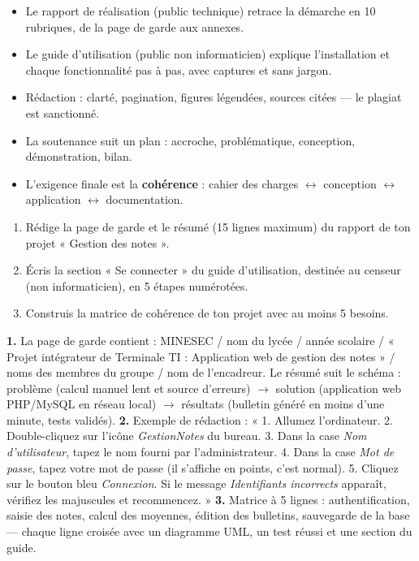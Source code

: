 \documentclass[11pt]{article}
\newcommand{\cle}[1]{{\popxbold\color{popdark}#1}}
\begin{document}
\begin{aretenir}
\begin{itemize}
\item Le \cle{rapport de réalisation} (public technique) retrace la démarche en 10 rubriques, de la page de garde aux annexes.
\item Le \cle{guide d'utilisation} (public non informaticien) explique l'installation et chaque fonctionnalité pas à pas, avec captures et sans jargon.
\item Rédaction : clarté, pagination, figures légendées, sources citées — le plagiat est sanctionné.
\item La soutenance suit un plan : accroche, problématique, conception, démonstration, bilan.
\item L'exigence finale est la \textbf{cohérence} : cahier des charges $\leftrightarrow$ conception $\leftrightarrow$ application $\leftrightarrow$ documentation.
\end{itemize}
\end{aretenir}

\begin{exercice}
\begin{enumerate}
\item Rédige la page de garde et le résumé (15 lignes maximum) du rapport de ton projet « Gestion des notes ».
\item Écris la section « Se connecter » du guide d'utilisation, destinée au censeur (non informaticien), en 5 étapes numérotées.
\item Construis la matrice de cohérence de ton projet avec au moins 5 besoins.
\end{enumerate}
\end{exercice}

\begin{corrige}[Exercice]
\textbf{1.} La page de garde contient : MINESEC / nom du lycée / année scolaire / « Projet intégrateur de Terminale TI : Application web de gestion des notes » / noms des membres du groupe / nom de l'encadreur. Le résumé suit le schéma : problème (calcul manuel lent et source d'erreurs) $\rightarrow$ solution (application web PHP/MySQL en réseau local) $\rightarrow$ résultats (bulletin généré en moins d'une minute, tests validés).
\textbf{2.} Exemple de rédaction : « 1. Allumez l'ordinateur. 2. Double-cliquez sur l'icône \emph{GestionNotes} du bureau. 3. Dans la case \emph{Nom d'utilisateur}, tapez le nom fourni par l'administrateur. 4. Dans la case \emph{Mot de passe}, tapez votre mot de passe (il s'affiche en points, c'est normal). 5. Cliquez sur le bouton bleu \emph{Connexion}. Si le message \emph{Identifiants incorrects} apparaît, vérifiez les majuscules et recommencez. »
\textbf{3.} Matrice à 5 lignes : authentification, saisie des notes, calcul des moyennes, édition des bulletins, sauvegarde de la base — chaque ligne croisée avec un diagramme UML, un test réussi et une section du guide.
\end{corrige}
\end{document}

